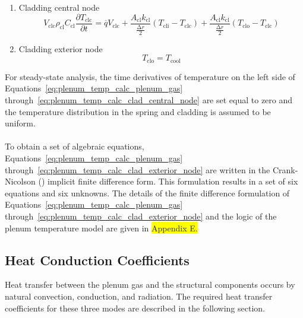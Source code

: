 \begin{enumerate}
  \item Cladding central node
    \begin{equation}
        \label{eq:plenum_temp_calc_clad_central_node}
        V_{\text{clc}}\rho_{\text{cl}}C_{\text{cl}}\frac{\partial T_{\text{clc}}}{\partial t} = \overline{q}V_{\text{clc}} + \frac{A_{\text{cl}}k_{\text{cl}}}{\frac{\mathrm{\Delta}r}{2}}\left( T_{\text{cli}} - T_{\text{clc}} \right) + \frac{A_{\text{cl}}k_{\text{cl}}}{\frac{\mathrm{\Delta}r}{2}}\left( T_{\text{clo}} - T_{\text{clc}} \right)
    \end{equation}

  \item Cladding exterior node
    \begin{equation}
        \label{eq:plenum_temp_calc_clad_exterior_node}
        T_{\text{clo}} = T_{\text{cool}}
    \end{equation}

\end{enumerate}

For steady-state analysis, the time derivatives of temperature on the left side of
Equations~\ref{eq:plenum_temp_calc_plenum_gas} through~\ref{eq:plenum_temp_calc_clad_central_node}
are set equal to zero and the temperature distribution in the spring and cladding is assumed to be
uniform.
\\
\\
To obtain a set of algebraic equations, Equations~\ref{eq:plenum_temp_calc_plenum_gas}
through~\ref{eq:plenum_temp_calc_clad_exterior_node} are written in the Crank-Nicolson
(\cite{ref:Crank1974}) implicit finite difference form. This formulation results in a set of six
equations and six unknowns. The details of the finite difference formulation of
Equations~\ref{eq:plenum_temp_calc_plenum_gas} through~\ref{eq:plenum_temp_calc_clad_exterior_node}
and the logic of the plenum temperature model are given in \colorbox{yellow}{Appendix E.}
\subsection{Heat Conduction Coefficients}\label{section:heat-conduction-coefficients}
Heat transfer between the plenum gas and the structural components occurs by natural convection,
conduction, and radiation. The required heat transfer coefficients for these three modes are
described in the following section.


